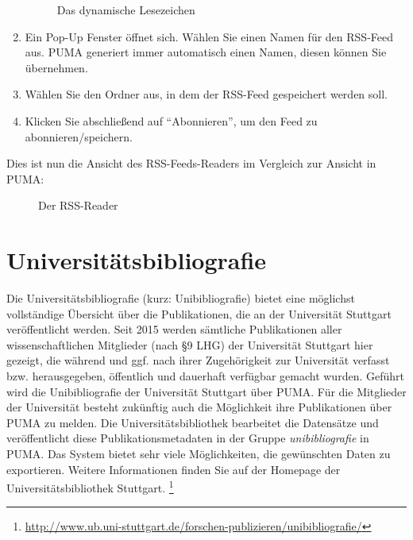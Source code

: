 \begin{enumerate}
\begin{figure}[h!]
 \caption{Das dynamische Lesezeichen}
 \label{fig:dynamischesLesezeichen}
\end{figure}
    \item Ein Pop-Up Fenster öffnet sich. Wählen Sie einen Namen für den RSS-Feed aus. PUMA generiert immer automatisch einen Namen, diesen können Sie übernehmen.
    \item Wählen Sie den Ordner aus, in dem der RSS-Feed gespeichert werden soll.
    \item Klicken Sie abschließend auf \enquote{Abonnieren}, um den Feed zu abonnieren/speichern.
\end{enumerate}
Dies ist nun die Ansicht des RSS-Feeds-Readers im Vergleich zur Ansicht in PUMA:
\begin{figure}[h!]
 \centering
 \caption{Der RSS-Reader}
 \label{fig:rssReader}
\end{figure}
\section{Universitätsbibliografie}
\label{sec:unibibliografie}
Die Universitätsbibliografie (kurz: Unibibliografie) bietet eine möglichst vollständige Übersicht über die Publikationen, die an der Universität Stuttgart veröffentlicht werden. Seit 2015 werden sämtliche Publikationen aller wissenschaftlichen Mitglieder (nach §9 LHG) der Universität Stuttgart hier gezeigt, die während und ggf. nach ihrer Zugehörigkeit zur Universität verfasst bzw. herausgegeben, öffentlich und dauerhaft verfügbar gemacht wurden.\newline\newline
Geführt wird die Unibibliografie der Universität Stuttgart über PUMA. Für die Mitglieder der Universität besteht zukünftig auch die Möglichkeit ihre Publikationen über PUMA zu melden. Die Universitätsbibliothek bearbeitet die Datensätze und veröffentlicht diese Publikationsmetadaten in der Gruppe \textit{unibibliografie} in PUMA. Das System bietet sehr viele Möglichkeiten, die gewünschten Daten zu exportieren. Weitere Informationen finden Sie auf der Homepage der Universitätsbibliothek Stuttgart. \footnote{\url{http://www.ub.uni-stuttgart.de/forschen-publizieren/unibibliografie/}}
